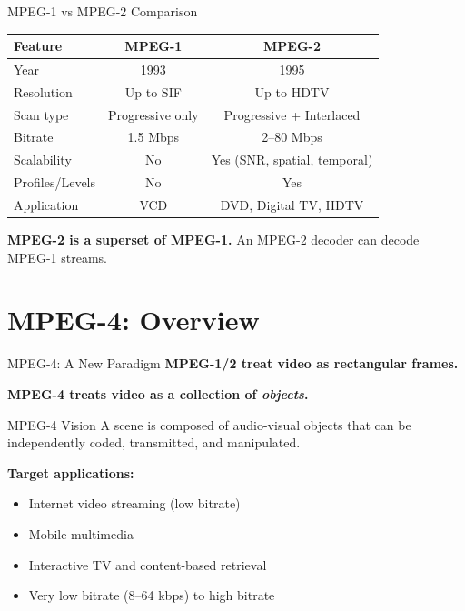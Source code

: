 \documentclass[aspectratio=169,12pt]{beamer}
\begin{document}
\begin{frame}{MPEG-1 vs MPEG-2 Comparison}
    \begin{center}
        \begin{tabular}{l|c|c}
            \toprule
            \textbf{Feature} & \textbf{MPEG-1} & \textbf{MPEG-2} \\
            \midrule
            Year & 1993 & 1995 \\
            Resolution & Up to SIF & Up to HDTV \\
            Scan type & Progressive only & Progressive + Interlaced \\
            Bitrate & 1.5 Mbps & 2--80 Mbps \\
            Scalability & No & Yes (SNR, spatial, temporal) \\
            Profiles/Levels & No & Yes \\
            Application & VCD & DVD, Digital TV, HDTV \\
            \bottomrule
        \end{tabular}
    \end{center}
    
    \vspace{0.3cm}
    \textbf{MPEG-2 is a superset of MPEG-1.} An MPEG-2 decoder can decode MPEG-1 streams.
\end{frame}


\section{MPEG-4: Overview}

\begin{frame}{MPEG-4: A New Paradigm}
    \textbf{MPEG-1/2 treat video as rectangular frames.}
    
    \textbf{MPEG-4 treats video as a collection of \textit{objects}.}
    
    \vspace{0.3cm}
    \begin{block}{MPEG-4 Vision}
        A scene is composed of audio-visual objects that can be independently coded, transmitted, and manipulated.
    \end{block}
    
    \vspace{0.3cm}
    \textbf{Target applications:}
    \begin{itemize}
        \item Internet video streaming (low bitrate)
        \item Mobile multimedia
        \item Interactive TV and content-based retrieval
        \item Very low bitrate (8--64 kbps) to high bitrate
    \end{itemize}
\end{frame}
\end{document}
